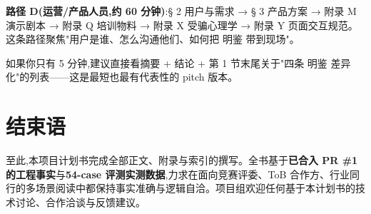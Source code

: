 \documentclass[UTF8,a4paper,12pt]{ctexart}
\begin{document}
\textbf{路径 D(运营/产品人员,约 60 分钟)}:§ 2 用户与需求 → § 3 产品方案 → 附录 M 演示剧本 → 附录 Q 培训物料 → 附录 X 受骗心理学 → 附录 Y 页面交互规范。这条路径聚焦"用户是谁、怎么沟通他们、如何把 明鉴 带到现场"。

如果你只有 5 分钟,建议直接看摘要 + 结论 + 第 1 节末尾关于"四条 明鉴 差异化"的列表——这是最短也最有代表性的 pitch 版本。

\section{结束语}

至此,本项目计划书完成全部正文、附录与索引的撰写。全书基于\textbf{已合入 PR \#1 的工程事实}与\textbf{54-case 评测实测数据},力求在面向竞赛评委、ToB 合作方、行业同行的多场景阅读中都保持事实准确与逻辑自洽。项目组欢迎任何基于本计划书的技术讨论、合作洽谈与反馈建议。
\end{document}
